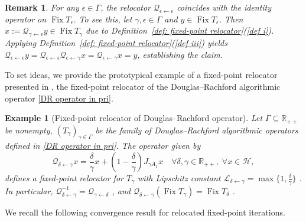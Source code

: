\documentclass[a4paper,12pt]{article}
\newtheorem{remark}[theorem]{Remark}
\newtheorem{example}[theorem]{Example}
\DeclareMathOperator{\Fix}{Fix}
\begin{document}
\begin{remark}\label{remark: identity relocator}
    For any $\epsilon\in\Gamma$, the relocator $\mathcal{Q}_{\epsilon\leftarrow\epsilon}$ coincides with the identity operator on $\Fix T_\epsilon$. To see this, let $\gamma,\epsilon\in\Gamma$ and $y\in\Fix T_{\epsilon}$. Then $x:=\mathcal{Q}_{\gamma\leftarrow\epsilon}y\in\Fix T_{\gamma}$ due to Definition~\ref{def: fixed-point relocator}(\ref{def i}). Applying Definition~\ref{def: fixed-point relocator}(\ref{def iii}) yields $\mathcal{Q}_{\epsilon\leftarrow\epsilon}y=\mathcal{Q}_{\epsilon\leftarrow\epsilon}\mathcal{Q}_{\epsilon\leftarrow\gamma}x=\mathcal{Q}_{\epsilon\leftarrow\gamma}x=y$, establishing the claim.
\end{remark}

 To set ideas, we provide the prototypical example of a fixed-point relocator presented in \cite{atenas2025relocated}, the fixed-point relocator of the Douglas--Rachford algorithmic operator \eqref{DR operator in pri}.


\begin{example}[Fixed-point relocator of Douglas--Rachford operator] \label{ex:FPR-DR}
    Let $\Gamma\subseteq\mathbb{R_{++}}$ be nonempty, $(T_\gamma)_{\gamma\in\Gamma}$ be the family of Douglas--Rachford algorithmic operators  defined in \eqref{DR operator in pri}. The operator given by
\begin{equation}\label{eq-NDR:relocator DR}
    \mathcal{Q}_{\delta\leftarrow\gamma}x=\frac{\delta}{\gamma}x+\left(1-\frac{\delta}{\gamma}\right)J_{\gamma A_1}x \quad\forall \delta, \gamma \in \mathbb{R}_{++}, \; \forall x \in \mathcal{H},
\end{equation} defines a fixed-point relocator for $T_\gamma$
with Lipschitz constant $\mathcal{L}_{\delta\leftarrow\gamma}=\max\{1,\frac{\delta}{\gamma}\}$ \cite[Lemma 4.7]{atenas2025relocated}.  In particular, $\mathcal{Q}_{\delta\leftarrow\gamma}^{-1} = \mathcal{Q}_{\gamma\leftarrow\delta}$ \cite[Lemma 3.1]{atenas2025relocated}, and $\mathcal{Q}_{\delta\leftarrow\gamma}(\Fix T_\gamma) = \Fix T_\delta$  \cite[Theorem 3.5]{atenas2025relocated}.
\end{example}
We recall the following convergence result for relocated fixed-point iterations. 
\end{document}
